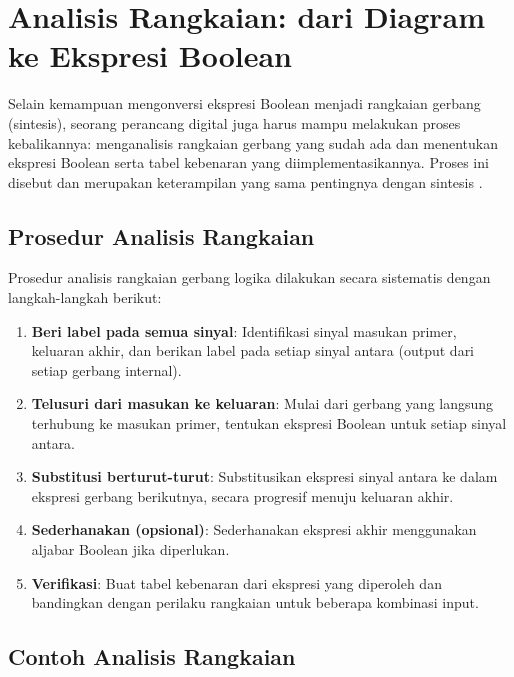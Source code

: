 \section{Analisis Rangkaian: dari Diagram ke Ekspresi Boolean}

Selain kemampuan mengonversi ekspresi Boolean menjadi rangkaian gerbang (sintesis), seorang perancang digital juga harus mampu melakukan proses kebalikannya: menganalisis rangkaian gerbang yang sudah ada dan menentukan ekspresi Boolean serta tabel kebenaran yang diimplementasikannya. Proses ini disebut  dan merupakan keterampilan yang sama pentingnya dengan sintesis \cite{rosen2019}.

\subsection{Prosedur Analisis Rangkaian}

Prosedur analisis rangkaian gerbang logika dilakukan secara sistematis dengan langkah-langkah berikut:

\begin{enumerate}
  \item \textbf{Beri label pada semua sinyal}: Identifikasi sinyal masukan primer, keluaran akhir, dan berikan label pada setiap sinyal antara (output dari setiap gerbang internal).
  \item \textbf{Telusuri dari masukan ke keluaran}: Mulai dari gerbang yang langsung terhubung ke masukan primer, tentukan ekspresi Boolean untuk setiap sinyal antara.
  \item \textbf{Substitusi berturut-turut}: Substitusikan ekspresi sinyal antara ke dalam ekspresi gerbang berikutnya, secara progresif menuju keluaran akhir.
  \item \textbf{Sederhanakan (opsional)}: Sederhanakan ekspresi akhir menggunakan aljabar Boolean jika diperlukan.
  \item \textbf{Verifikasi}: Buat tabel kebenaran dari ekspresi yang diperoleh dan bandingkan dengan perilaku rangkaian untuk beberapa kombinasi input.
\end{enumerate}

\subsection{Contoh Analisis Rangkaian}

